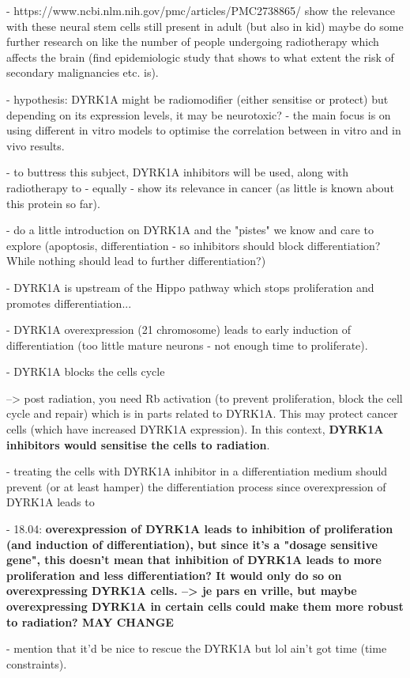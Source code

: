 \documentclass[onecolumn,10pt]{asme2ej}
\begin{document}
- https://www.ncbi.nlm.nih.gov/pmc/articles/PMC2738865/
show the relevance with these neural stem cells still present in adult (but also in kid) maybe do some further research on like the number of people undergoing radiotherapy which affects the brain (find epidemiologic study that shows to what extent the risk of secondary malignancies etc. is).

- hypothesis: DYRK1A might be radiomodifier (either sensitise or protect) but depending on its expression levels, it may be neurotoxic?
- the main focus is on using different in vitro models to optimise the correlation between in vitro and in vivo results.

- to buttress this subject, DYRK1A inhibitors will be used, along with radiotherapy to - equally - show its relevance in cancer (as little is known about this protein so far). 

- do a little introduction on DYRK1A and the "pistes" we know and care to explore (apoptosis, differentiation - so inhibitors should block differentiation? While nothing should lead to further differentiation?)

- DYRK1A is upstream of the Hippo pathway which stops proliferation and promotes differentiation... 

- DYRK1A overexpression (21 chromosome) leads to early induction of differentiation (too little mature neurons - not enough time to proliferate). 

- DYRK1A blocks the cells cycle 

--> post radiation, you need Rb activation (to prevent proliferation, block the cell cycle and repair) which is in parts related to DYRK1A. This may protect cancer cells (which have increased DYRK1A expression). In this context, \textbf{DYRK1A inhibitors would sensitise the cells to radiation}. 

- treating the cells with DYRK1A inhibitor in a differentiation medium should prevent (or at least hamper) the differentiation process since overexpression of DYRK1A leads to 


- 18.04: \textbf{overexpression of DYRK1A leads to inhibition of proliferation (and induction of differentiation), but since it's a "dosage sensitive gene", this doesn't mean that inhibition of DYRK1A leads to more proliferation and less differentiation? It would only do so on overexpressing DYRK1A cells. --> je pars en vrille, but maybe overexpressing DYRK1A in certain cells could make them more robust to radiation? MAY CHANGE}

- mention that it'd be nice to rescue the DYRK1A but lol ain't got time (time constraints).
\end{document}
